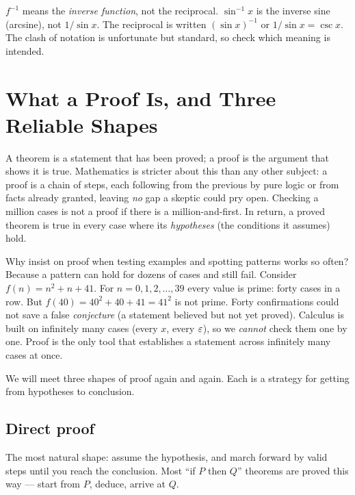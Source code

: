 \begin{trapbox}
$f^{-1}$ means the \emph{inverse function}, not the reciprocal. $\sin^{-1}x$ is the
inverse sine (arcsine), not $1/\sin x$. The reciprocal is written $(\sin x)^{-1}$
or $1/\sin x = \csc x$. The clash of notation is unfortunate but standard, so
check which meaning is intended.
\end{trapbox}

\section{What a Proof Is, and Three Reliable Shapes}
\label{ch40:proof}

A theorem is a statement that has been proved; a proof is the argument that shows
it is true. Mathematics is stricter about this than any other subject: a proof is
a chain of
steps, each following from the previous by pure logic or from facts already
granted, leaving \emph{no} gap a skeptic could pry open. Checking a million cases
is not a proof if there is a million-and-first. In return, a proved theorem is
true in every case where its \emph{hypotheses} (the conditions it assumes) hold.

\begin{aestheticbox}
Why insist on proof when testing examples and spotting patterns works so often?
Because a pattern can hold for dozens of cases and still fail. Consider $f(n) = n^2 + n + 41$. For $n=0,1,2,\dots,39$ every
value is prime: forty cases in a row. But
$f(40)=40^2+40+41 = 41^2$ is not prime. Forty confirmations could not save a false
\emph{conjecture} (a statement believed but not yet proved). Calculus is built on
infinitely many cases (every $x$, every $\varepsilon$), so we \emph{cannot} check them
one by one. Proof is the only tool that establishes a statement across infinitely
many cases at once.
\end{aestheticbox}

We will meet three shapes of proof again and again. Each is a strategy for getting
from hypotheses to conclusion.

\subsection{Direct proof}

The most natural shape: assume the hypothesis, and march forward by valid steps
until you reach the conclusion. Most ``if $P$ then $Q$'' theorems are proved this
way --- start from $P$, deduce, arrive at $Q$.

